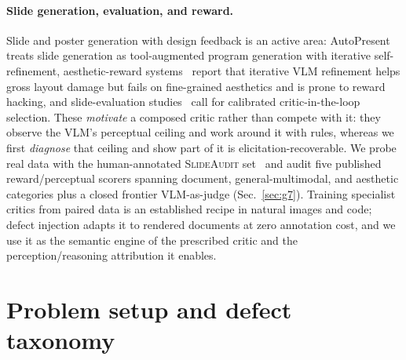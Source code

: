 \documentclass[10pt]{article}
\begin{document}
\paragraph{Slide generation, evaluation, and reward.}
Slide and poster generation with design feedback is an active area: AutoPresent~\cite{autopresent} treats
slide generation as tool-augmented program generation with iterative self-refinement, aesthetic-reward
systems~\cite{aeslides,evopresent} report that iterative VLM refinement helps gross layout damage but fails on
fine-grained aesthetics and is prone to reward hacking, and slide-evaluation studies~\cite{vlmslideeval} call
for calibrated critic-in-the-loop selection. These \emph{motivate} a composed critic rather than compete with it:
they observe the VLM's perceptual ceiling and work around it with rules, whereas we first \emph{diagnose} that
ceiling and show part of it is elicitation-recoverable. We probe real data with the human-annotated
\textsc{SlideAudit} set~\cite{slideaudit} and audit five published reward/perceptual scorers spanning document,
general-multimodal, and aesthetic categories plus a closed frontier VLM-as-judge (Sec.~\ref{sec:g7}). Training
specialist critics from paired data is an established recipe in natural images and code; defect injection adapts
it to rendered documents at zero annotation cost, and we use it as the semantic engine of the prescribed critic and
the perception/reasoning attribution it enables.

\section{Problem setup and defect taxonomy}\label{sec:setup}
\end{document}
